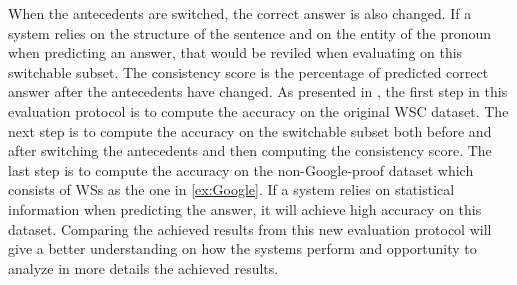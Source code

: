 When the antecedents are switched, the correct answer is also changed. If a system relies on the structure of the sentence and on the entity of the pronoun when predicting an answer, that would be reviled when evaluating on this switchable subset.
The consistency score is the percentage of predicted correct answer after the antecedents have changed. 
As presented in \cite{DBLP:journals/corr/abs-1811-01778}, the first step in this evaluation protocol is to compute the accuracy on the original WSC dataset. The next step is to compute the accuracy on the switchable subset both before and after switching the antecedents and then computing the consistency score. The last step is to compute the accuracy on the non-Google-proof dataset which consists of WSs as the one in \ref{ex:Google}. If a system relies on statistical information when predicting the answer, it will achieve high accuracy on this dataset. 
Comparing the achieved results from this new evaluation protocol will give a better understanding on how the systems perform and opportunity to analyze in more details the achieved results. 



